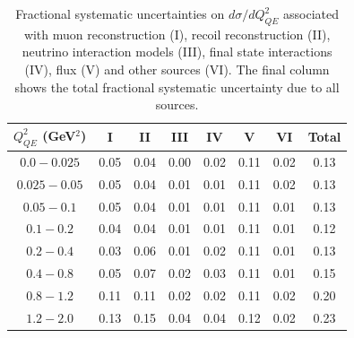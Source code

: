 \begingroup
\squeezetable
\begin{table}
\begin{tabular}{cccccccc}
$Q^2_{QE}$ (GeV$^2$) & I & II & III & IV & V & VI & Total \\
\hline
$0.0 - 0.025$ & 0.05 & 0.04 & 0.00 & 0.02 & 0.11 & 0.02 & 0.13 \\
$0.025 - 0.05$ & 0.05 & 0.04 & 0.01 & 0.01 & 0.11 & 0.02 & 0.13 \\
$0.05 - 0.1$ & 0.05 & 0.04 & 0.01 & 0.01 & 0.11 & 0.01 & 0.13 \\
$0.1 - 0.2$ & 0.04 & 0.04 & 0.01 & 0.01 & 0.11 & 0.01 & 0.12 \\
$0.2 - 0.4$ & 0.03 & 0.06 & 0.01 & 0.02 & 0.11 & 0.01 & 0.13 \\
$0.4 - 0.8$ & 0.05 & 0.07 & 0.02 & 0.03 & 0.11 & 0.01 & 0.15 \\
$0.8 - 1.2$ & 0.11 & 0.11 & 0.02 & 0.02 & 0.11 & 0.02 & 0.20 \\
$1.2 - 2.0$ & 0.13 & 0.15 & 0.04 & 0.04 & 0.12 & 0.02 & 0.23 \\
\hline
\end{tabular}
\caption{Fractional systematic uncertainties on $d\sigma/dQ^2_{QE}$ associated with muon reconstruction (I), recoil reconstruction (II), neutrino interaction models (III), final state interactions (IV), flux (V) and other sources (VI).  The final column shows the total fractional systematic uncertainty due to all sources.}
\label{tab:systematics}
\end{table}
\endgroup
